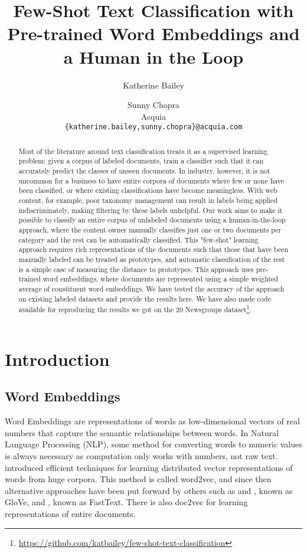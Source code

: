 \documentclass{article} %
\title{Few-Shot Text Classification with Pre-trained Word Embeddings and a Human in the Loop}
\author{Katherine Bailey \and Sunny Chopra \\
  Acquia \\
  \texttt{\{katherine.bailey,sunny.chopra\}@acquia.com}
}
\date{}
\begin{document}
\maketitle

\begin{abstract}
Most of the literature around text classification treats it as a supervised learning problem: given a corpus of labeled documents, train a classifier such that it can accurately predict the classes of unseen documents. In industry, however, it is not uncommon for a business to have entire corpora of documents where few or none have been classified, or where existing classifications have become meaningless. With web content, for example, poor taxonomy management can result in labels being applied indiscriminately, making filtering by these labels unhelpful. Our work aims to make it possible to classify an entire corpus of unlabeled documents using a human-in-the-loop approach, where the content owner manually classifies just one or two documents per category and the rest can be automatically classified. This "few-shot" learning approach requires rich representations of the documents such that those that have been manually labeled can be treated as prototypes, and automatic classification of the rest is a simple case of measuring the distance to prototypes. This approach uses pre-trained word embeddings, where documents are represented using a simple weighted average of constituent word embeddings. We have tested the accuracy of the approach on existing labeled datasets and provide the results here. We have also made code available for reproducing the results we got on the 20 Newsgroups dataset\footnote{\url{https://github.com/katbailey/few-shot-text-classification}}.
\end{abstract}

\section{Introduction}

\subsection*{Word Embeddings}

Word Embeddings are representations of words as low-dimensional vectors of real numbers that capture the semantic relationships between words. In Natural Language Processing (NLP), some method for converting words to numeric values is always necessary as computation only works with numbers, not raw text. \citep{mikolov2013distributed} introduced efficient techniques for learning distributed vector representations of words from huge corpora. This method is called word2vec, and since then alternative approaches have been put forward by others such as and \citep{pennington2014glove}, known as GloVe, and \citep{bojanowski2016subword}, known as FastText. There is also doc2vec for learning representations of entire documents.
\end{document}
